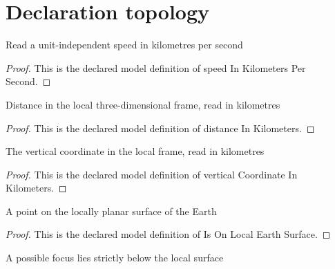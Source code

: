 \section{Declaration topology}
\begin{definition}
  \label{def:physics:phyx-mini-0239:phyxminiproblems-problemphyxmini0239-speedinkilometerspersecond}
  Read a unit-independent speed in kilometres per second
\end{definition}
\begin{proof}
  This is the declared model definition of speed In Kilometers Per Second.
\end{proof}
\begin{definition}
  \label{def:physics:phyx-mini-0239:phyxminiproblems-problemphyxmini0239-distanceinkilometers}
  Distance in the local three-dimensional frame, read in kilometres
\end{definition}
\begin{proof}
  This is the declared model definition of distance In Kilometers.
\end{proof}
\begin{definition}
  \label{def:physics:phyx-mini-0239:phyxminiproblems-problemphyxmini0239-verticalcoordinateinkilometers}
  The vertical coordinate in the local frame, read in kilometres
\end{definition}
\begin{proof}
  This is the declared model definition of vertical Coordinate In Kilometers.
\end{proof}
\begin{definition}
  \label{def:physics:phyx-mini-0239:phyxminiproblems-problemphyxmini0239-isonlocalearthsurface}
  A point on the locally planar surface of the Earth
\end{definition}
\begin{proof}
  This is the declared model definition of Is On Local Earth Surface.
\end{proof}
\begin{definition}[Is Underground]
  \label{def:physics:phyx-mini-0239:phyxminiproblems-problemphyxmini0239-isunderground}
  A possible focus lies strictly below the local surface
\end{definition}
